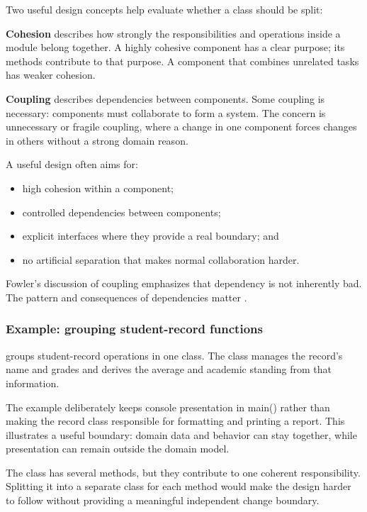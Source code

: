 \documentclass[12pt,a4paper]{article}
\begin{document}
Two useful design concepts help evaluate whether a class should be split:

\textbf{Cohesion} describes how strongly the responsibilities and operations inside a module belong together. A highly cohesive component has a clear purpose; its methods contribute to that purpose. A component that combines unrelated tasks has weaker cohesion.

\textbf{Coupling} describes dependencies between components. Some coupling is necessary: components must collaborate to form a system. The concern is unnecessary or fragile coupling, where a change in one component forces changes in others without a strong domain reason.

A useful design often aims for:

\begin{itemize}

\item high cohesion within a component;

\item controlled dependencies between components;

\item explicit interfaces where they provide a real boundary; and

\item no artificial separation that makes normal collaboration harder.

\end{itemize}

Fowler's discussion of coupling emphasizes that dependency is not inherently bad. The pattern and consequences of dependencies matter \cite{fowler2001coupling}.

\subsubsection{Example: grouping student-record functions}

 groups student-record operations in one class. The class manages the record's name and grades and derives the average and academic standing from that information.

The example deliberately keeps console presentation in main() rather than making the record class responsible for formatting and printing a report. This illustrates a useful boundary: domain data and behavior can stay together, while presentation can remain outside the domain model.

The class has several methods, but they contribute to one coherent responsibility. Splitting it into a separate class for each method would make the design harder to follow without providing a meaningful independent change boundary.
\end{document}
